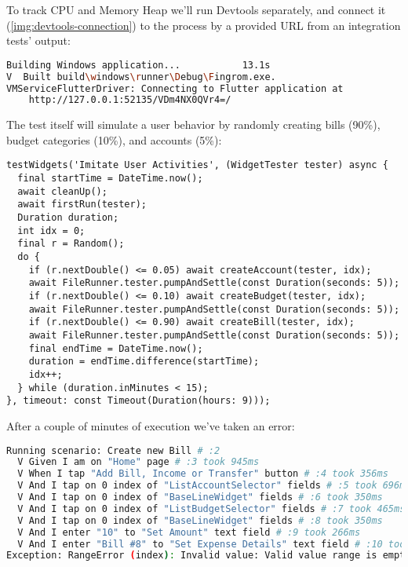 \noindent To track CPU and Memory Heap we'll run Devtools separately, and connect it (\cref{img:devtools-connection}) 
to the process by a provided URL from an integration tests' output:

\begin{lstlisting}[language=bash]
Building Windows application...           13.1s
V  Built build\windows\runner\Debug\Fingrom.exe.
VMServiceFlutterDriver: Connecting to Flutter application at 
    http://127.0.0.1:52135/VDm4NX0QVr4=/
\end{lstlisting}

\noindent The test itself will simulate a user behavior by randomly creating bills (90\%), budget categories (10\%),
and accounts (5\%): 

\begin{lstlisting}
testWidgets('Imitate User Activities', (WidgetTester tester) async {
  final startTime = DateTime.now();
  await cleanUp();
  await firstRun(tester);
  Duration duration;
  int idx = 0;
  final r = Random();
  do {
    if (r.nextDouble() <= 0.05) await createAccount(tester, idx);
    await FileRunner.tester.pumpAndSettle(const Duration(seconds: 5));
    if (r.nextDouble() <= 0.10) await createBudget(tester, idx);
    await FileRunner.tester.pumpAndSettle(const Duration(seconds: 5));
    if (r.nextDouble() <= 0.90) await createBill(tester, idx);
    await FileRunner.tester.pumpAndSettle(const Duration(seconds: 5));
    final endTime = DateTime.now();
    duration = endTime.difference(startTime);
    idx++;
  } while (duration.inMinutes < 15);
}, timeout: const Timeout(Duration(hours: 9)));
\end{lstlisting}

\noindent After a couple of minutes of execution we've taken an error:

\begin{lstlisting}[language=bash]
Running scenario: Create new Bill # :2
  V Given I am on "Home" page # :3 took 945ms
  V When I tap "Add Bill, Income or Transfer" button # :4 took 356ms
  V And I tap on 0 index of "ListAccountSelector" fields # :5 took 696ms
  V And I tap on 0 index of "BaseLineWidget" fields # :6 took 350ms
  V And I tap on 0 index of "ListBudgetSelector" fields # :7 took 465ms
  V And I tap on 0 index of "BaseLineWidget" fields # :8 took 350ms
  V And I enter "10" to "Set Amount" text field # :9 took 266ms
  V And I enter "Bill #8" to "Set Expense Details" text field # :10 took 266ms
Exception: RangeError (index): Invalid value: Valid value range is empty: -1
\end{lstlisting}

